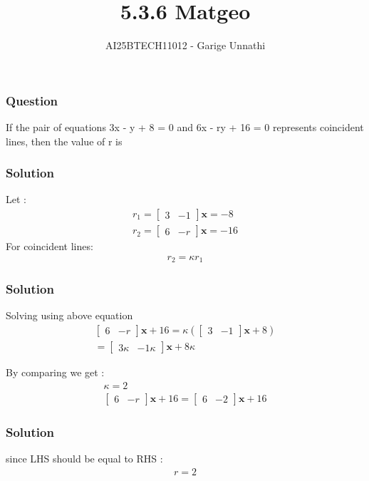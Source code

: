 \documentclass{beamer}
\title{5.3.6 Matgeo}
\author{AI25BTECH11012 - Garige Unnathi}
\date{}
\begin{document}
\frame{\titlepage}

\begin{frame}
\frametitle{Question}
If the pair of equations 3x - y + 8 = 0 and 6x - ry + 16 = 0 represents coincident
lines, then the value of r is 
\end{frame}


\begin{frame}
\frametitle{Solution}
Let :
\begin{align}
    \textbf{$r_1$} = \begin{bmatrix}3 & -1\end{bmatrix}\textbf{x} = -8 \\
    \textbf{$r_2$} = \begin{bmatrix}6 & -r\end{bmatrix}\textbf{x} = -16
\end{align}
For coincident lines:
\begin{align}
    \textbf{$r_2$} = \kappa  \textbf{$r_1$}
\end{align}
\end{frame}

\begin{frame}
\frametitle{Solution}
Solving using above equation 
\begin{align}
    \begin{bmatrix}6 & -r\end{bmatrix}\textbf{x} + 16 = \kappa(\begin{bmatrix}3 & -1\end{bmatrix}\textbf{x} + 8)\\
     = \begin{bmatrix}3\kappa & -1\kappa\end{bmatrix}\textbf{x} + 8\kappa
\end{align}

By comparing we get :
\begin{align}
    \kappa = 2\\
     \begin{bmatrix}6 & -r\end{bmatrix}\textbf{x} + 16 = \begin{bmatrix}6 & -2 \end{bmatrix}\textbf{x} + 16
\end{align}
\end{frame}


\begin{frame}
\frametitle{Solution}
since LHS should be equal to RHS :
\begin{align}
    r = 2
\end{align}
\end{frame}
\end{document}
